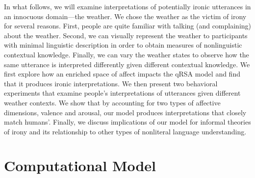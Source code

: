 \documentclass[10pt,letterpaper]{article}
\begin{document}




In what follows, we will examine interpretations of potentially ironic utterances in an innocuous domain---the weather. We chose the weather as the victim of irony for several reasons. First, people are quite familiar with talking (and complaining) about the weather. Second, we can visually represent the weather to participants with minimal linguistic description in order to obtain measures of nonlinguistic contextual knowledge. Finally, we can vary the weather states to observe how the same utterance is interpreted differently given different contextual knowledge. We first explore how an enriched space of affect impacts the qRSA model and find that it produces ironic interpretations. We then present two behavioral experiments that examine people's interpretations of utterances given different weather contexts. We show that by accounting for two types of affective dimensions, valence and arousal, our model produces interpretations that closely match humans'. Finally, we discuss implications of our model for informal theories of irony and its relationship to other types of nonliteral language understanding.

\section{Computational Model}


%
%
\end{document}
